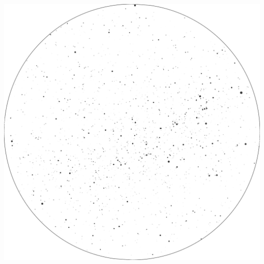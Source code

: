 \documentclass{./SAS-class-skygen}
\begin{document}
	\vspace{0.5cm}
    \begin{center}
    \includegraphics[width=\textwidth]{./pics/skychart17.png}
    \end{center}
    
    
\end{document}
